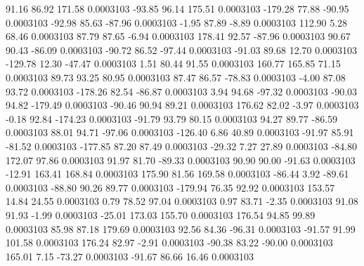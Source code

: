        91.16       86.92      171.58     0.0003103
      -93.85       96.14      175.51     0.0003103
     -179.28       77.88      -90.95     0.0003103
      -92.98       85.63      -87.96     0.0003103
       -1.95       87.89       -8.89     0.0003103
      112.90        5.28       68.46     0.0003103
       87.79       87.65       -6.94     0.0003103
      178.41       92.57      -87.96     0.0003103
       90.67       90.43      -86.09     0.0003103
      -90.72       86.52      -97.44     0.0003103
      -91.03       89.68       12.70     0.0003103
     -129.78       12.30      -47.47     0.0003103
        1.51       80.44       91.55     0.0003103
      160.77      165.85       71.15     0.0003103
       89.73       93.25       80.95     0.0003103
       87.47       86.57      -78.83     0.0003103
       -4.00       87.08       93.72     0.0003103
     -178.26       82.54      -86.87     0.0003103
        3.94       94.68      -97.32     0.0003103
      -90.03       94.82     -179.49     0.0003103
      -90.46       90.94       89.21     0.0003103
      176.62       82.02       -3.97     0.0003103
       -0.18       92.84     -174.23     0.0003103
      -91.79       93.79       80.15     0.0003103
       94.27       89.77      -86.59     0.0003103
       88.01       94.71      -97.06     0.0003103
     -126.40        6.86       40.89     0.0003103
      -91.97       85.91      -81.52     0.0003103
     -177.85       87.20       87.49     0.0003103
      -29.32        7.27       27.89     0.0003103
      -84.80      172.07       97.86     0.0003103
       91.97       81.70      -89.33     0.0003103
       90.90       90.00      -91.63     0.0003103
      -12.91      163.41      168.84     0.0003103
      175.90       81.56      169.58     0.0003103
      -86.44        3.92      -89.61     0.0003103
      -88.80       90.26       89.77     0.0003103
     -179.94       76.35       92.92     0.0003103
      153.57       14.84       24.55     0.0003103
        0.79       78.52       97.04     0.0003103
        0.97       83.71       -2.35     0.0003103
       91.08       91.93       -1.99     0.0003103
      -25.01      173.03      155.70     0.0003103
      176.54       94.85       99.89     0.0003103
       85.98       87.18      179.69     0.0003103
       92.56       84.36      -96.31     0.0003103
      -91.57       91.99      101.58     0.0003103
      176.24       82.97       -2.91     0.0003103
      -90.38       83.22      -90.00     0.0003103
      165.01        7.15      -73.27     0.0003103
      -91.67       86.66       16.46     0.0003103
